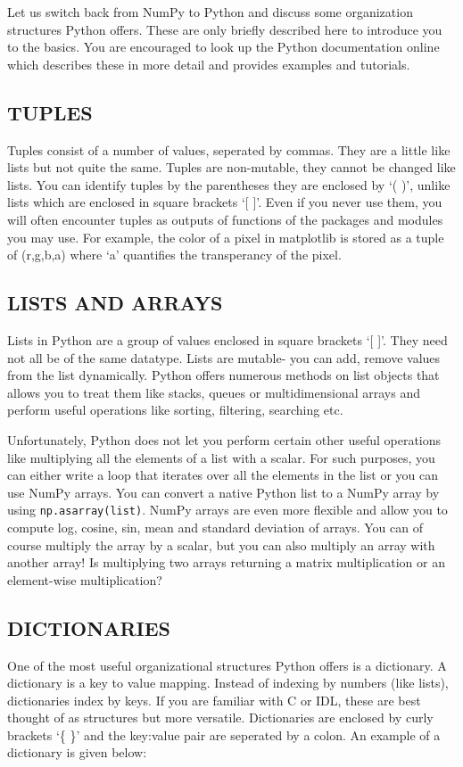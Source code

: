 \documentclass[psfig,preprint]{aastex}
\begin{document}
Let us switch back from NumPy to Python and discuss some organization 
structures Python offers. These are only briefly described here to 
introduce you to the basics. You are encouraged to look up the Python 
documentation online which describes these in more detail and provides 
examples and tutorials.

\subsection{TUPLES}
Tuples consist of a number of values, seperated by commas. They are a 
little like lists but not quite the same. Tuples are non-mutable, they 
cannot be changed like lists. You can identify tuples by the parentheses 
they are enclosed by `( )', unlike lists which are enclosed in square 
brackets `[ ]'. Even if you never use them, you will often encounter tuples 
as outputs of functions of the packages and modules you may use. For example, 
the color of a pixel in matplotlib is stored as a tuple of (r,g,b,a) where `a' 
quantifies the transperancy of the pixel.

\subsection{LISTS AND ARRAYS}
Lists in Python are a group of values enclosed in square brackets `[ ]'. They 
need not all be of the same datatype. Lists are mutable- you can add, 
remove values from the list dynamically. Python offers numerous methods on list 
objects that allows you to treat them like stacks, queues or multidimensional 
arrays and perform useful operations like sorting, filtering, searching etc.

Unfortunately, Python does not let you perform certain other useful 
operations like multiplying all the elements of a list with a scalar. For 
such purposes, you can either write a loop that iterates over all the 
elements in the list or you can use NumPy arrays. You can convert a native 
Python list to a NumPy array by using {\tt np.asarray(list)}. NumPy arrays are even 
more flexible and allow you to compute log, cosine, sin, mean and standard 
deviation of arrays. You can of course multiply the array by a scalar, but you can also multiply an array with another array! Is multiplying two arrays returning a matrix multiplication or an element-wise multiplication?

\subsection{DICTIONARIES}
One of the most useful organizational structures Python offers is a dictionary. 
A dictionary is a key to value mapping. Instead of indexing by numbers 
(like lists), dictionaries index by keys. If you are familiar with C or IDL, 
these are best thought of as structures but more versatile. Dictionaries are enclosed by curly brackets `\{ \}' and the key:value pair are seperated by a colon. An example of a dictionary is given below:
\end{document}
